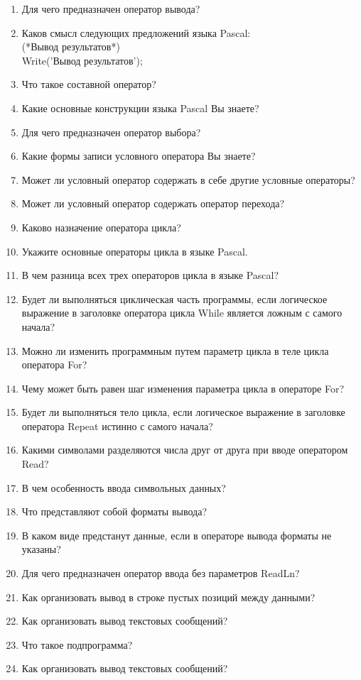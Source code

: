 \begin{enumerate}
\item Для чего предназначен оператор вывода?
\item Каков смысл следующих предложений языка Pascal:\\
(*Вывод результатов*) \\Write('Вывод результатов');
\item Что такое составной оператор?
\item Какие основные конструкции языка Pascal Вы знаете?
\item Для чего предназначен оператор выбора?
\item Какие формы записи условного оператора Вы знаете?
\item Может ли условный оператор содержать в себе другие условные операторы?
\item Может ли условный оператор содержать оператор пере­хода?
\item Каково назначение оператора цикла?
\item Укажите основные операторы цикла в языке Pascal.
\item В чем разница всех трех операторов цикла в языке Pascal?
\item Будет ли выполняться циклическая часть программы, если логическое выражение в заголовке оператора цикла While является ложным с самого начала?
\item Можно ли изменить программным путем параметр цикла в теле цикла оператора For?
\item Чему может быть равен шаг изменения параметра цикла в операторе For?
\item Будет ли выполняться тело цикла, если логическое выра­жение в заголовке оператора Repeat истинно с самого начала?
\item Какими символами разделяются числа друг от друга при вводе оператором Read?
\item В чем особенность ввода символьных данных?
\item Что представляют собой форматы вывода?
\item В каком виде предстанут данные, если в операторе вывода форматы не указаны?
\item Для чего предназначен оператор ввода без параметров ReadLn?
\item Как организовать вывод в строке пустых позиций между данными?
\item Как организовать вывод текстовых сообщений?
\item Что такое подпрограмма?
\item Как организовать вывод текстовых сообщений?

\end{enumerate}
